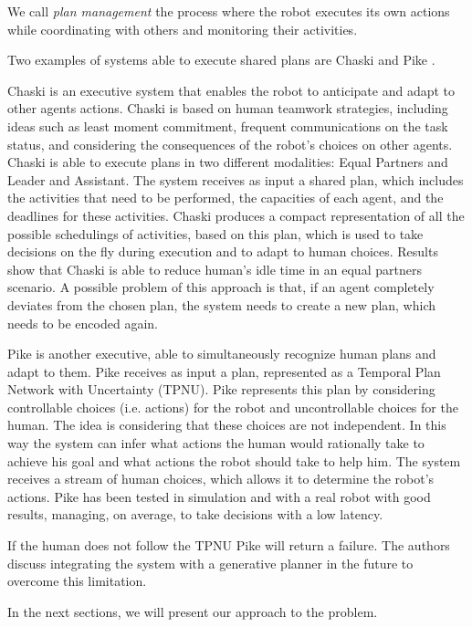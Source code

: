 We call \textit{plan management} the process where the robot executes its own actions while coordinating with others and monitoring their activities. 

Two examples of systems able to execute shared plans are  Chaski \citep{shah2011improved} and Pike \citep{levine2014concurrent,karpas2015robust}.

Chaski is an executive system that enables the robot to anticipate and adapt to other agents actions. Chaski is based on human teamwork strategies, including ideas such as least moment commitment, frequent communications on the task status, and considering the consequences of the robot's choices on other agents. Chaski is able to execute plans in two different modalities: Equal Partners and Leader and Assistant. The system receives as input a shared plan, which includes the activities that need to be performed, the capacities of each agent, and the deadlines for these activities. Chaski produces a compact representation of all the possible schedulings of activities, based on this plan, which is used to take decisions on the fly during execution and to adapt to human choices. Results show that Chaski is able to reduce human's idle time in an equal partners scenario. A possible problem of this approach is that, if an agent completely deviates from the chosen plan, the system needs to create a new plan, which needs to be encoded again.

Pike is another executive, able to simultaneously recognize human plans and adapt to them. Pike receives as input a plan, represented as a Temporal Plan Network with Uncertainty (TPNU). Pike represents this plan by considering controllable choices (i.e. actions) for the robot and uncontrollable choices for the human. The idea is considering that these choices are not independent.  In this way the system can infer what actions the human would rationally take to achieve his goal and what actions the robot should take to help him. The system receives a stream of human choices, which allows it to determine the robot's actions. Pike has been tested in simulation and with a real robot with good results, managing, on average, to take decisions with a low latency.

If the human does not follow the TPNU Pike will return a failure. The authors discuss integrating the system with a generative planner in the future to overcome this limitation.

In the next sections, we will present our approach to the problem.

